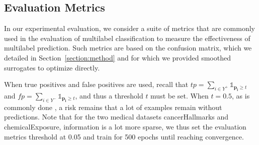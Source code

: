 






\subsection{Evaluation Metrics}
\label{sec:evalMetrics}

In our experimental evaluation, we consider a suite of metrics that are commonly used in the evaluation of multilabel classification to measure the effectiveness of multilabel prediction. Such metrics are based on the confusion matrix, which we detailed in Section~\ref{section:method} and for which we provided smoothed surrogates to optimize directly.

When true positives and false positives are used, recall that \(t p=\sum_{i \in Y^{+}} \mathds{1}_{\mathbf{p_i} \geq t}\) and \(f p=\sum_{i \in Y^{-}} \mathds{1}_{\mathbf{p_i} \geq t}\), and thus a threshold \(t\) must be set. When \(t = 0.5\), as is commonly done , a risk remains that a lot of examples remain without predictions. 
Note that for the two medical datasets cancerHallmarks and chemicalExposure, information is a lot more sparse, we thus set the evaluation metrics threshold at 0.05 and train for 500 epochs until reaching convergence. 

